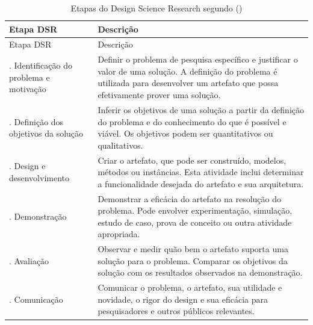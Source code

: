 {\def\LTcaptype{quadro}
\begin{longtable}[]{@{}
  >{\raggedright\arraybackslash}p{}
  >{\raggedright\arraybackslash}p{}@{}}
\caption{Etapas do Design Science Research segundo \citeauthor{peffers2007} (\citeyear{peffers2007})}\label{quadro:dsr-etapas}\\
\toprule\noalign{}
\begin{minipage}[b]{\linewidth}\raggedright
Etapa DSR
\end{minipage} & \begin{minipage}[b]{\linewidth}\raggedright
Descrição
\end{minipage} \\
\midrule\noalign{}
\endfirsthead
\toprule\noalign{}
\begin{minipage}[b]{\linewidth}\raggedright
Etapa DSR
\end{minipage} & \begin{minipage}[b]{\linewidth}\raggedright
Descrição
\end{minipage} \\
\midrule\noalign{}
\endhead
\bottomrule\noalign{}
\endlastfoot
1. Identificação do problema e motivação & Definir o problema de
pesquisa específico e justificar o valor de uma solução. A definição do
problema é utilizada para desenvolver um artefato que possa
efetivamente prover uma solução. \\
2. Definição dos objetivos da solução & Inferir os objetivos de uma
solução a partir da definição do problema e do conhecimento do que é
possível e viável. Os objetivos podem ser quantitativos ou
qualitativos. \\
3. Design e desenvolvimento & Criar o artefato, que pode ser construído,
modelos, métodos ou instâncias. Esta atividade inclui determinar a
funcionalidade desejada do artefato e sua arquitetura. \\
4. Demonstração & Demonstrar a eficácia do artefato na resolução do
problema. Pode envolver experimentação, simulação, estudo de caso, prova
de conceito ou outra atividade apropriada. \\
5. Avaliação & Observar e medir quão bem o artefato suporta uma solução
para o problema. Comparar os objetivos da solução com os resultados
observados na demonstração. \\
6. Comunicação & Comunicar o problema, o artefato, sua utilidade e
novidade, o rigor do design e sua eficácia para pesquisadores e outros
públicos relevantes. \\
\end{longtable}
}

